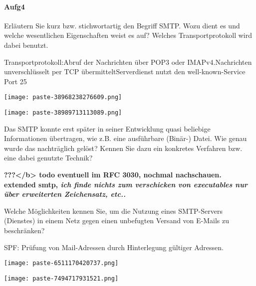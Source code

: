 \documentclass{article}
\begin{document}
\paragraph{Aufg4}
\begin{tcolorbox}[colback=white!10!white,colframe=lightgray!75!black,
  savelowerto=\jobname_ex.tex,breakable,enhanced,lines before break=40]

\justifying
Erläutern Sie kurz bzw. stichwortartig den Begriff SMTP. Wozu dient es und welche wesentlichen Eigenschaften weist es auf? Welches Transportprotokoll wird dabei benutzt.

\tcblower

\justifying
Transportprotokoll:Abruf der Nachrichten über POP3 oder IMAPv4.Nachrichten unverschlüsselt per TCP übermitteltServerdienst nutzt den well-known-Service Port 25\begin{center}
\texttt{[image: paste-38968238276609.png]}
\end{center}
\begin{center}
\texttt{[image: paste-38989713113089.png]}
\end{center}

\end{tcolorbox}
\begin{tcolorbox}[colback=white!10!white,colframe=lightgray!75!black,
  savelowerto=\jobname_ex.tex,breakable,enhanced,lines before break=40]

\justifying
Das SMTP konnte erst später in seiner Entwicklung quasi beliebige Informationen übertragen, wie z.B. eine ausführbare (Binär-) Datei. Wie genau wurde das nachträglich gelöst? Kennen Sie dazu ein konkretes Verfahren bzw. eine dabei genutzte Technik?

\tcblower

\justifying
\textbf{???</b> todo eventuell im RFC 3030, nochmal nachschauen. extended smtp, \textit{ich finde nichts zum verschicken von executables nur über erweiterten Zeichensatz, etc..}}
\end{tcolorbox}
\begin{tcolorbox}[colback=white!10!white,colframe=lightgray!75!black,
  savelowerto=\jobname_ex.tex,breakable,enhanced,lines before break=40]

\justifying
Welche Möglichkeiten kennen Sie, um die Nutzung eines SMTP-Servers (Dienstes) in einem Netz gegen einen unbefugten Versand von E-Mails zu beschränken?

\tcblower

\justifying
SPF: Prüfung von Mail-Adressen durch Hinterlegung gültiger Adressen.\textbf{}\begin{center}
\texttt{[image: paste-6511170420737.png]}
\end{center}
\begin{center}
\texttt{[image: paste-7494717931521.png]}
\end{center}

\end{tcolorbox}
\end{document}
